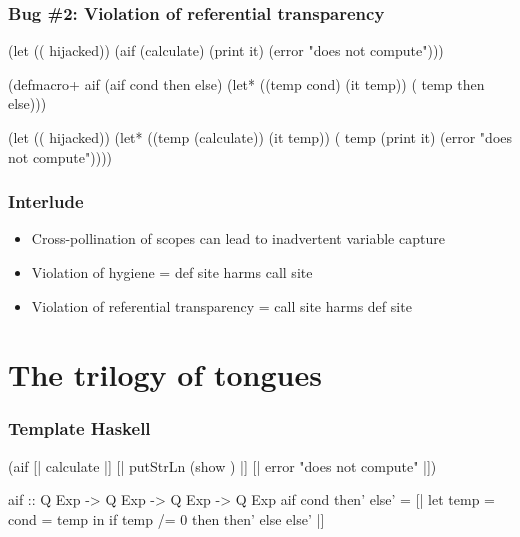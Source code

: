 \documentclass[hyperref={bookmarks=false}]{beamer}
\begin{document}
\begin{frame}[fragile]
\frametitle{Bug \#2: Violation of referential transparency}
\begin{semiverbatim}
(let ((\text{\color{blue}{if}} hijacked))
  (aif (calculate)
    (print it)
    (error "does not compute")))

(defmacro+ aif
  (aif cond then else)
  (let* ((temp cond)
         (it temp))
    (\text{\color{red}{if}} temp then else)))

(let ((\text{\color{blue}{if}} hijacked))
  (let* ((temp (calculate))
         (it temp))
    (\text{\color{blue}{if}} temp
      (print it)
      (error "does not compute"))))
\end{semiverbatim}
\end{frame}

\begin{frame}[fragile]
\frametitle{Interlude}
\begin{itemize}
\item Cross-pollination of scopes can lead to inadvertent variable capture
\item Violation of hygiene = def site harms call site
\item Violation of referential transparency = call site harms def site
\end{itemize}
\end{frame}

\section{The trilogy of tongues}

\begin{frame}[fragile]
\frametitle{Template Haskell}
\begin{semiverbatim}
{\textdollar}(aif [| calculate |]
  [| putStrLn (show ) |]
  [| error "does not compute" |])

aif :: Q Exp -> Q Exp -> Q Exp -> Q Exp
aif cond then' else' =
  [| let temp = {\textdollar}cond
          = temp
     in if temp /= 0 then {\textdollar}then' else {\textdollar}else' |]


\end{semiverbatim}
\end{frame}
\end{document}

